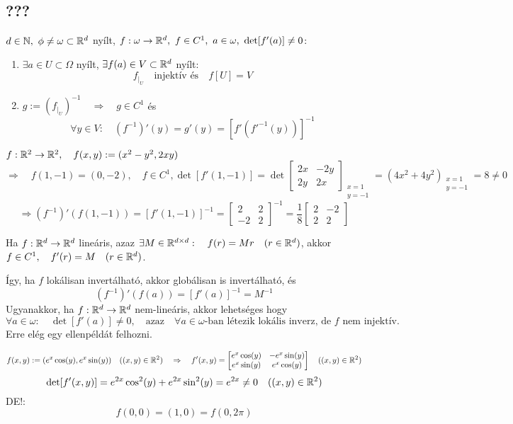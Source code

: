 \documentclass[a4paper,11.5pt]{article}
\begin{document}
	\subsection{???}
	\begin{theorem}
		$d\in\N,\ \phi\not=\omega\subset\R^d$ nyílt, $f:\omega\to\R^d,\ f\in C^1,\ a\in\omega,\ \det[f'(a)]\not=0$:
		\begin{enumerate}
			\item $\exists a\in U\subset\varOmega$ nyílt, $\exists f(a)\in V\subset\mathbb{R}^d$ nyílt:
			\[ f_{\big|_U}\quad \text{injektív és}\quad f[U]=V \]
			\item $g:=\left(f_{\big|_U}\right)^{-1}\quad \Rightarrow\quad g\in C^1$ és
			\[ \forall y\in V:\quad (f^{-1})'(y)=g'(y)=[f'(f'^{-1}(y))]^{-1} \]
		\end{enumerate}
	\end{theorem}
	\begin{example}
		$f:\mathbb{R}^2\to\mathbb{R}^2,\quad f(x,y):=(x^2-y^2, 2xy)$ \[\Rightarrow\quad f(1,-1)=(0,-2),\quad f\in C^1, \det[f'(1,-1)]=\det \begin{bmatrix}
			2x&-2y\\
			2y&2x
		\end{bmatrix}_{\substack{x=1\\y=-1}}=(4x^2+4y^2)_{\substack{x=1\\y=-1}}=8\not=0\]
		\[ \Rightarrow (f^{-1})'(f(1,-1))=[f'(1,-1)]^{-1}=\begin{bmatrix}
			2&2\\
			-2&2
		\end{bmatrix}^{-1}=\frac{1}{8} \begin{bmatrix}
			2&-2\\
			2&2
		\end{bmatrix} \]
	\end{example}
	\begin{note}
		Ha $f:\mathbb{R}^d\to\mathbb{R}^d$ lineáris, azaz $\exists M\in\mathbb{R}^{d\times d}:\quad f(r)=Mr\quad (r\in\mathbb{R}^d)$, akkor $f\in C^1,\quad f'(r)=M\quad (r\in\mathbb{R}^d)$.
		
		Így, ha $f$ lokálisan invertálható, akkor globálisan is invertálható, és
		\[ (f^{-1})'(f(a))=[f'(a)]^{-1}=M^{-1} \]
		Ugyanakkor, ha $f:\mathbb{R}^d\to\mathbb{R}^d$ nem-lineáris, akkor lehetséges hogy $ \forall a\in\omega:\quad \det[f'(a)]\not=0,\quad \text{azaz}\quad \forall a\in\omega\text{-ban létezik lokális inverz, de $f$ nem injektív.}$ Erre elég egy ellenpéldát felhozni.
		\begin{example}
			\[ f(x,y):=(e^x\cos(y),e^x\sin(y))\quad ((x,y)\in\mathbb{R}^2)\quad \Rightarrow\quad f'(x,y)=\begin{bmatrix}
				e^x\cos(y)&-e^x\sin(y)\\
				e^x\sin(y)&e^x\cos(y)
			\end{bmatrix}\quad ((x,y)\in\mathbb{R}^2) \]
		\[ \det[f'(x,y)]=e^{2x}\cos^2(y)+e^{2x}\sin^2(y)=e^{2x}\not=0\quad ((x,y)\in\mathbb{R}^2) \]
		DE!:
		\[ f(0,0)=(1,0)=f(0,2\pi) \]
		\end{example}
	\end{note}
\end{document}
